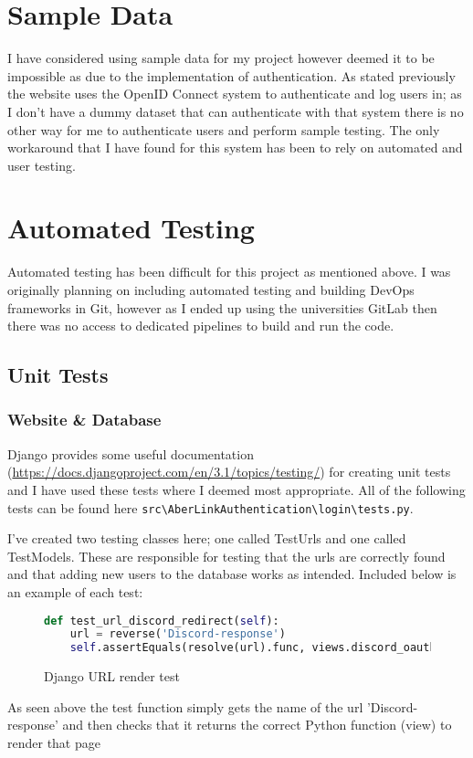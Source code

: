 
\section{Sample Data}
I have considered using sample data for my project however deemed it to be impossible as due to the implementation of authentication. As stated previously the website uses the OpenID Connect \cite{OpenID} system to authenticate and log users in; as I don't have a dummy dataset that can authenticate with that system there is no other way for me to authenticate users and perform sample testing. The only workaround that I have found for this system has been to rely on automated and user testing.

\section{Automated Testing}
Automated testing has been difficult for this project as mentioned above. I was originally planning on including automated testing and building DevOps frameworks in Git, however as I ended up using the universities GitLab then there was no access to dedicated pipelines to build and run the code.  

\subsection{Unit Tests}

\subsubsection{Website \& Database}
Django provides some useful documentation (\href{https://docs.djangoproject.com/en/3.1/topics/testing/}{https://docs.djangoproject.com/en/3.1/topics/testing/}) for creating unit tests and I have used these tests where I deemed most appropriate. All of the following tests can be found here \verb|src\AberLinkAuthentication\login\tests.py|. 

I've created two testing classes here; one called TestUrls and one called TestModels. These are responsible for testing that the urls are correctly found and that adding new users to the database works as intended. Included below is an example of each test:

\begin{figure}[H]
\begin{lstlisting}[language=Python]
def test_url_discord_redirect(self):
    url = reverse('Discord-response')
    self.assertEquals(resolve(url).func, views.discord_oauth2_redirect)
\end{lstlisting}
\caption{Django URL render test}
\label{fig:django-url}
\end{figure}
As seen above the test function simply gets the name of the url 'Discord-response' and then checks that it returns the correct Python function (view) to render that page

